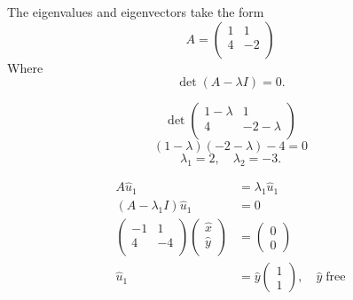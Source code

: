 \documentclass[12pt]{article}
\begin{document}
The eigenvalues and eigenvectors take the form
$$A = \begin{pmatrix} 1 & 1 \\ 4 & -2 \\ \end{pmatrix}$$
Where $$\det(A-\lambda I)=0.$$

\begin{equation}
  \det \begin{pmatrix}
    1-\lambda & 1 \\
    4 & -2-\lambda \\
  \end{pmatrix}
\end{equation}
$$(1-\lambda)(-2-\lambda)-4=0$$
$$\lambda_1=2,\quad \lambda_2=-3.$$

\begin{equation}
  \begin{aligned}
    A\hat{u}_1 &= \lambda_1\hat{u}_1 \\
    (A-\lambda_1I)\hat{u}_1 &= 0 \\
    \begin{pmatrix}
      -1 & 1 \\ 4 & -4 \\
    \end{pmatrix}
    \begin{pmatrix}
      \hat{x} \\ \hat{y} \\
    \end{pmatrix} &=
    \begin{pmatrix}
      0 \\ 0
    \end{pmatrix} \\
    \hat{u}_1 &= \hat{y}
    \begin{pmatrix}
      1 \\ 1
    \end{pmatrix}, \quad \hat{y}\;\text{free}
  \end{aligned}
\end{equation}
\end{document}
